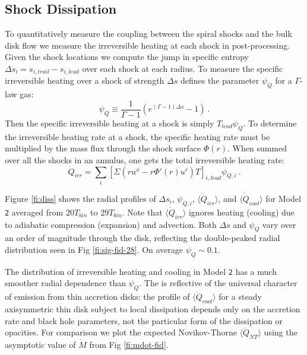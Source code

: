 \documentclass{emulateapj}
\newcommand{\Gam}{\Gamma}
\newcommand{\De}{\Delta}
\newcommand{\model}[1]{{Model \texttt{#1}}}
\newcommand{\avet}[1]{ \langle #1 \rangle}
\begin{document}


\subsection{Shock Dissipation}
\label{subsec:diss}

To quantitatively measure the coupling between the spiral shocks and the bulk disk flow we measure the irreversible heating at each shock in post-processing.  Given the shock locations we compute the jump in specific entropy $\Delta s_i = s_{i,trail} - s_{i,lead}$ over each shock at each radius.  To measure the specific irreversible heating over a shock of strength $\De s$ \cite{Rafikov16} defines the parameter $\psi_Q$ for a $\Gam$-law gas:
\begin{equation}
	\psi_Q \equiv \frac{1}{\Gam - 1} \left( e^{(\Gam -1)\De s } - 1 \right) \ . \label{eq:def-psi}
\end{equation}
Then the specific irreversible heating at a shock is simply $T_{lead} \psi_Q$.  To determine the irreversible heating rate at a shock, the specific heating rate must be multiplied by the mass flux through the shock surface $\Phi(r)$.  When summed over all the shocks in an annulus, one gets the total irreversible heating rate:
\begin{equation}
	\dot{Q}_{irr} = \sum_i \left[ \Sigma \left(r u^\phi - r \Phi'(r) u^r \right) T \right]_{i,lead} \psi_{Q,i} \ . \label{eq:QirrRaf}
\end{equation}

Figure \ref{fi:diss} shows the radial profiles of $\Delta s_i$, $\psi_{Q,i}$, $\avet{\dot{Q}_{irr}}$, and $\avet{\dot{Q}_{cool}}$ for \model{2} averaged from $20 T_{bin}$ to $29 T_{bin}$.  Note that $\avet{\dot{Q}_{irr}}$ ignores heating (cooling) due to adiabatic compression (expansion) and advection.  Both $\De s$ and $\psi_Q$ vary over an order of magnitude through the disk, reflecting the double-peaked radial distribution seen in Fig \ref{fi:sig-fid-28}. On average $\psi_Q \sim 0.1$.  

The distribution of irreversible heating and cooling in \model{2} has a much smoother radial dependence than $\psi_Q$. The is reflective of the universal character of emission from thin accretion disks: the profile of $\avet{\dot{Q}_{cool}}$ for a steady axisymmetric thin disk subject to local dissipation depends only on the accretion rate and black hole parameters, not the particular form of the dissipation or opacities.  For comparison we plot the expected Novikov-Thorne $\avet{\dot{Q}_{NT}}$ using the asymptotic value of $\dot{M}$ from Fig \ref{fi:mdot-fid}. 
\end{document}
